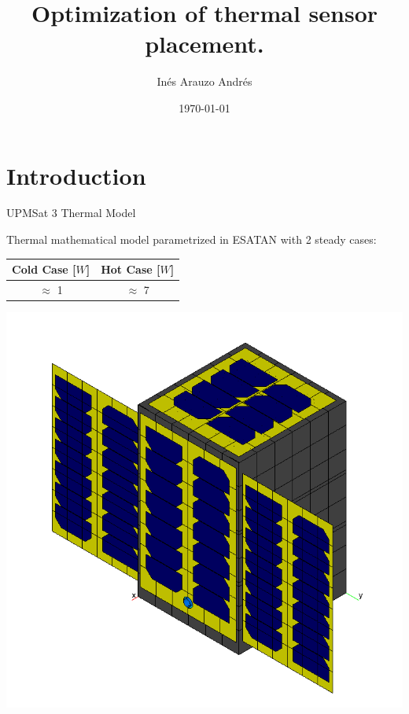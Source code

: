 \documentclass{cubeamer}
\title{Optimization of thermal sensor placement.}
\author[Inés Arauzo Andres]{Inés Arauzo Andrés}
\date{\today} %
\institute[UPM]{OAPES Project \\

\footnotesize{ IDR-UPM-ETSIAE}}
\begin{document}
\maketitle

\cutoc

\section{Introduction}

\begin{frame}{UPMSat 3 Thermal Model}
\begin{minipage}{0.4\textwidth}
      Thermal mathematical model parametrized in ESATAN with 2 steady cases:
    \begin{center}
    \begin{tabular}{cc}
    \toprule
    \textbf{Cold Case }[$W$] & \textbf{Hot Case } [$W$]\\ \midrule
    $\approx$ 1 & $\approx$ 7\\
    \bottomrule
    \end{tabular}
    \end{center}  
\end{minipage}
        \begin{minipage}{0.5\textwidth}
    \begin{flushright}
        \includegraphics[width=0.9\linewidth]{Figures/UPMSAT3-esatan.png}
    \end{flushright} 
    \end{minipage}
\end{frame}
\end{document}
